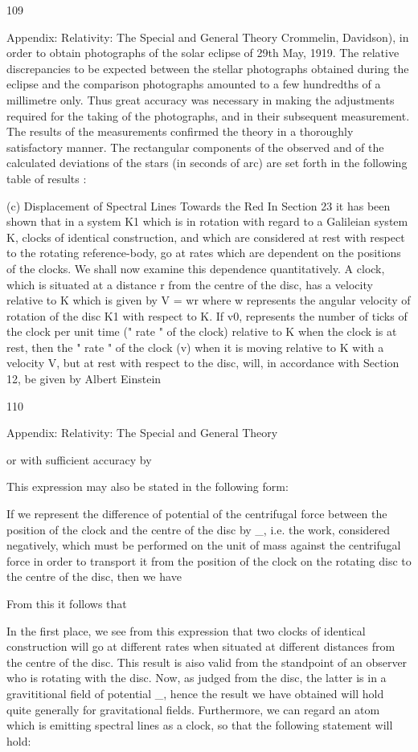 \documentclass{article}
\begin{document}
109

Appendix: Relativity: The Special and General Theory
Crommelin, Davidson), in order to obtain photographs of the solar eclipse of 29th May,
1919. The relative discrepancies to be expected between the stellar photographs obtained
during the eclipse and the comparison photographs amounted to a few hundredths of a
millimetre only. Thus great accuracy was necessary in making the adjustments required for
the taking of the photographs, and in their subsequent measurement.
The results of the measurements confirmed the theory in a thoroughly satisfactory
manner. The rectangular components of the observed and of the calculated deviations of the
stars (in seconds of arc) are set forth in the following table of results :

(c) Displacement of Spectral Lines Towards the Red
In Section 23 it has been shown that in a system K1 which is in rotation with regard to a
Galileian system K, clocks of identical construction, and which are considered at rest with
respect to the rotating reference-body, go at rates which are dependent on the positions of
the clocks. We shall now examine this dependence quantitatively. A clock, which is situated
at a distance r from the centre of the disc, has a velocity relative to K which is given by
V = wr
where w represents the angular velocity of rotation of the disc K1 with respect to K. If v0,
represents the number of ticks of the clock per unit time (" rate " of the clock) relative to K
when the clock is at rest, then the " rate " of the clock (v) when it is moving relative to K
with a velocity V, but at rest with respect to the disc, will, in accordance with Section 12, be
given by
Albert Einstein

110

Appendix: Relativity: The Special and General Theory

or with sufficient accuracy by

This expression may also be stated in the following form:

If we represent the difference of potential of the centrifugal force between the position of
the clock and the centre of the disc by \_, i.e. the work, considered negatively, which must
be performed on the unit of mass against the centrifugal force in order to transport it from
the position of the clock on the rotating disc to the centre of the disc, then we have

From this it follows that

In the first place, we see from this expression that two clocks of identical construction
will go at different rates when situated at different distances from the centre of the disc.
This result is aiso valid from the standpoint of an observer who is rotating with the disc.
Now, as judged from the disc, the latter is in a gravititional field of potential \_, hence the
result we have obtained will hold quite generally for gravitational fields. Furthermore, we
can regard an atom which is emitting spectral lines as a clock, so that the following
statement will hold:
\end{document}
